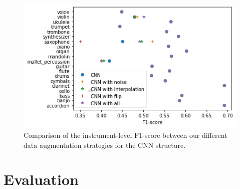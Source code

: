 \documentclass[final]{cvpr}
\begin{document}
\begin{figure}
	\centering
	\includegraphics[scale = 0.5]{cnn_data.png}
	\caption{Comparison of the instrument-level F1-score between our different data augmentation strategies for the CNN structure.}
	\label{cnn_data}
\end{figure}
\section{Evaluation}

{\small
	
	
}
\end{document}
